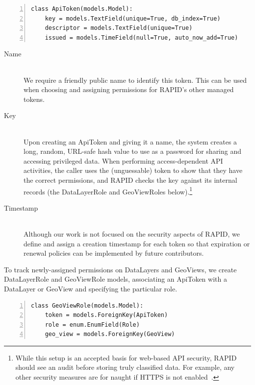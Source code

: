 \begin{Verbatim}[samepage=true,baselinestretch=1,numbers=left,xleftmargin=12mm]
class ApiToken(models.Model):
    key = models.TextField(unique=True, db_index=True)
    descriptor = models.TextField(unique=True)
    issued = models.TimeField(null=True, auto_now_add=True)
\end{Verbatim}

\begin{description}
\item[Name] \hfill \\
We require a friendly public name to identify this token. This can be used when choosing and assigning permissions for RAPID's other managed tokens.

\item[Key] \hfill \\
Upon creating an ApiToken and giving it a name, the system creates a long, random, URL-safe hash value to use as a password for sharing and accessing privileged data. When performing access-dependent API activities, the caller uses the (unguessable) token to show that they have the correct permissions, and RAPID checks the key against its internal records (the DataLayerRole and GeoViewRoles below).\footnote{While this setup is an accepted basis for web-based API security, RAPID should see an audit before storing truly classified data. For example, any other security measures are for naught if HTTPS is not enabled~\cite{Stormpath,Palmer}. }

\item[Timestamp] \hfill \\
Although our work is not focused on the security aspects of RAPID, we define and assign a creation timestamp for each token so that expiration or renewal policies can be implemented by future contributors.

\end{description}
To track newly-assigned permissions on DataLayers and GeoViews, we create DataLayerRole and GeoViewRole models, associating an ApiToken with a DataLayer or GeoView and specifying the particular role.


\begin{Verbatim}[samepage=true,baselinestretch=1,numbers=left,xleftmargin=12mm]
class GeoViewRole(models.Model):
    token = models.ForeignKey(ApiToken)
    role = enum.EnumField(Role)
    geo_view = models.ForeignKey(GeoView)
\end{Verbatim}

